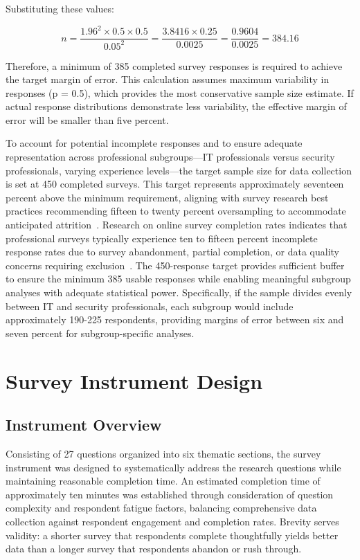 Substituting these values:

\begin{equation}
  \label{eqn:ModelSizeCalc}
  n = \frac{1.96^2 \times 0.5 \times 0.5}{0.05^2} = \frac{3.8416 \times 0.25}{0.0025} = \frac{0.9604}{0.0025} = 384.16
\end{equation}

Therefore, a minimum of 385 completed survey responses is required to achieve the target margin of error. This calculation assumes maximum variability in responses (p = 0.5), which provides the most conservative sample size estimate. If actual response distributions demonstrate less variability, the effective margin of error will be smaller than five percent.

To account for potential incomplete responses and to ensure adequate representation across professional subgroups---IT professionals versus security professionals, varying experience levels---the target sample size for data collection is set at 450 completed surveys. This target represents approximately seventeen percent above the minimum requirement, aligning with survey research best practices recommending fifteen to twenty percent oversampling to accommodate anticipated attrition~\parencite{Dillman_Smyth_Christian_2014}. Research on online survey completion rates indicates that professional surveys typically experience ten to fifteen percent incomplete response rates due to survey abandonment, partial completion, or data quality concerns requiring exclusion~\parencite{Fan_Yan_2010}. The 450-response target provides sufficient buffer to ensure the minimum 385 usable responses while enabling meaningful subgroup analyses with adequate statistical power. Specifically, if the sample divides evenly between IT and security professionals, each subgroup would include approximately 190-225 respondents, providing margins of error between six and seven percent for subgroup-specific analyses.

\section{Survey Instrument Design}

\subsection{Instrument Overview}

Consisting of 27 questions organized into six thematic sections, the survey instrument was designed to systematically address the research questions while maintaining reasonable completion time. An estimated completion time of approximately ten minutes was established through consideration of question complexity and respondent fatigue factors, balancing comprehensive data collection against respondent engagement and completion rates. Brevity serves validity: a shorter survey that respondents complete thoughtfully yields better data than a longer survey that respondents abandon or rush through.

